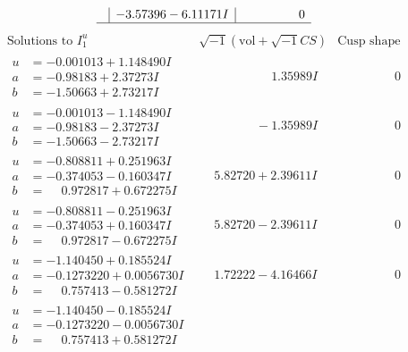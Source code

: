 \documentclass[1p]{elsarticle_modified}
\theoremstyle{definition}
\newcommand{\I}{\sqrt{-1}}
\begin{document}
$$\begin{array}{c|c|c}
 & -3.57396 - 6.11171 I & \phantom{-0.000000 } 0\\
 \hline 
 \end{array}$$\newpage$$\begin{array}{c|c|c}  
\text{Solutions to }I^u_{1}& \I (\text{vol} + \sqrt{-1}CS) & \text{Cusp shape}\\
 \hline 
\begin{aligned}
u &= -0.001013 + 1.148490 I \\
a &= -0.98183 + 2.37273 I \\
b &= -1.50663 + 2.73217 I\end{aligned}
 & \phantom{-0.000000 -}1.35989 I & \phantom{-0.000000 } 0 \\ \hline\begin{aligned}
u &= -0.001013 - 1.148490 I \\
a &= -0.98183 - 2.37273 I \\
b &= -1.50663 - 2.73217 I\end{aligned}
 & \phantom{-0.000000 } -1.35989 I & \phantom{-0.000000 } 0 \\ \hline\begin{aligned}
u &= -0.808811 + 0.251963 I \\
a &= -0.374053 - 0.160347 I \\
b &= \phantom{-}0.972817 + 0.672275 I\end{aligned}
 & \phantom{-}5.82720 + 2.39611 I & \phantom{-0.000000 } 0 \\ \hline\begin{aligned}
u &= -0.808811 - 0.251963 I \\
a &= -0.374053 + 0.160347 I \\
b &= \phantom{-}0.972817 - 0.672275 I\end{aligned}
 & \phantom{-}5.82720 - 2.39611 I & \phantom{-0.000000 } 0 \\ \hline\begin{aligned}
u &= -1.140450 + 0.185524 I \\
a &= -0.1273220 + 0.0056730 I \\
b &= \phantom{-}0.757413 - 0.581272 I\end{aligned}
 & \phantom{-}1.72222 - 4.16466 I & \phantom{-0.000000 } 0 \\ \hline\begin{aligned}
u &= -1.140450 - 0.185524 I \\
a &= -0.1273220 - 0.0056730 I \\
b &= \phantom{-}0.757413 + 0.581272 I\end{aligned}

\end{array}$$
\end{document}
